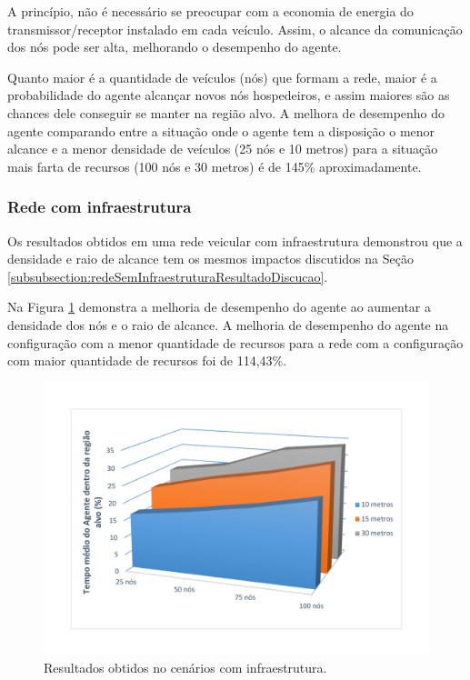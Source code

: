 A princípio, não é necessário se preocupar com a economia de energia do transmissor/receptor instalado em cada veículo. Assim, o alcance da comunicação dos nós pode ser alta, melhorando o desempenho do agente. 

Quanto maior é a quantidade de veículos (nós) que formam a rede, maior é a probabilidade do agente alcançar novos nós hospedeiros, e assim maiores são as chances dele conseguir se manter na região alvo. A melhora de desempenho do agente comparando entre a situação onde o agente tem a disposição o menor alcance e a menor densidade de veículos (25 nós e 10 metros) para a situação mais farta de recursos (100 nós e 30 metros) é de 145\% aproximadamente.   


\subsubsection{Rede com infraestrutura}

	Os resultados obtidos em uma rede veicular com infraestrutura demonstrou que a densidade e raio de alcance tem os mesmos impactos discutidos na Seção \ref{subsubsection:redeSemInfraestruturaResultadoDiscucao}.

	Na Figura \ref{fig:graficosComTorres} demonstra a melhoria de desempenho do agente ao aumentar a densidade dos nós e o raio de alcance. A melhoria de desempenho do agente na configuração com a menor quantidade de recursos para a rede com a configuração com maior quantidade de recursos foi de 114,43\%.   
 

	\begin{figure}[htbp]
		\centering
		\includegraphics[scale=0.34]{resultados/graficos/graficoComTorres.pdf}
		\caption{Resultados obtidos no cenários com infraestrutura.}
		\label{fig:graficosComTorres}
	\end{figure}

